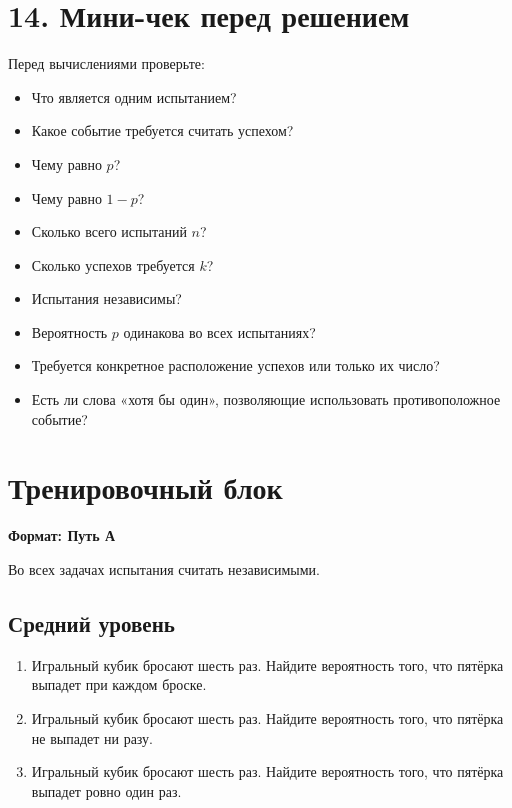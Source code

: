 \documentclass[a4paper,12pt]{article}
\begin{document}
\section*{\color{darkaccent}14. Мини-чек перед решением}

Перед вычислениями проверьте:

\begin{itemize}
    \item[$\square$] Что является одним испытанием?
    \item[$\square$] Какое событие требуется считать успехом?
    \item[$\square$] Чему равно $p$?
    \item[$\square$] Чему равно $1-p$?
    \item[$\square$] Сколько всего испытаний $n$?
    \item[$\square$] Сколько успехов требуется $k$?
    \item[$\square$] Испытания независимы?
    \item[$\square$] Вероятность $p$ одинакова во всех испытаниях?
    \item[$\square$] Требуется конкретное расположение успехов или только их число?
    \item[$\square$] Есть ли слова «хотя бы один», позволяющие использовать противоположное событие?
\end{itemize}


\newpage

\section*{\color{darkaccent}Тренировочный блок}

\textbf{Формат: Путь А}

Во всех задачах испытания считать независимыми.

\subsection*{\color{darkaccent}Средний уровень}

\begin{enumerate}[label=\textbf{\arabic*.}]

    \item Игральный кубик бросают шесть раз. Найдите вероятность того, что пятёрка выпадет при каждом броске.

    \item Игральный кубик бросают шесть раз. Найдите вероятность того, что пятёрка не выпадет ни разу.

    \item Игральный кубик бросают шесть раз. Найдите вероятность того, что пятёрка выпадет ровно один раз.

\end{enumerate}
\end{document}
